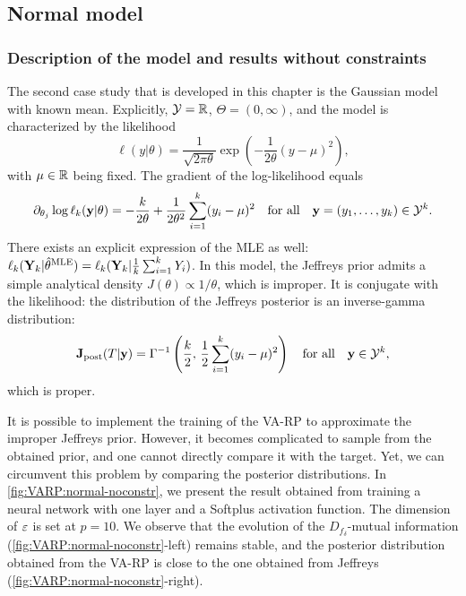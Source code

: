 \subsection{Normal model}


\subsubsection{Description of the model and results without constraints}

The second case study that is developed in this chapter is the Gaussian model with known mean. Explicitly, $\mathcal{Y}=\mathbb{R}$, $\Theta=(0,\infty)$, and the model is characterized by the likelihood 
\begin{equation}
    \ell(y|\theta) = \frac{1}{\sqrt{2\pi\theta}}\exp\left(-\frac{1}{2\theta}(y-\mu)^2\right),
\end{equation}
with $\mu\in\mathbb{R}$ being fixed. The gradient of the log-likelihood equals
\begin{equation}
    \partial_{\theta_j}\log\ell_k(\mathbf{y}|\theta) = -\frac{k}{2\theta}+\frac{1}{2\theta^2}\sum_{i=1}^k(y_i-\mu)^2\quad\text{for all}\quad \mathbf{y}=(y_1,\dots,y_k)\in\mathcal{Y}^k.
\end{equation}
There exists an explicit expression of the  MLE as well: $\ell_k(\mathbf{Y}_k|\hat\theta^{\text{MLE}})= \ell_k(\mathbf{Y}_k|\frac{1}{k}\sum_{i=1}^kY_i)$. In this model, the Jeffreys prior admits a simple analytical density $J(\theta)\propto1/\theta$, which is improper. 
It is conjugate with the likelihood: the distribution of the Jeffreys posterior is an inverse-gamma distribution:
    \begin{equation}
        \mathbf{J}_{\text{post}}(T|\mathbf{y}) = \Gamma^{-1}\left(\frac{k}{2},\,\frac{1}{2}\sum_{i=1}^{k}(y_i-\mu)^2\right)    \quad\text{for all}\quad \mathbf{y}\in\mathcal{Y}^k,
    \end{equation}
which is proper.

It is possible to implement the training of the VA-RP to approximate the improper Jeffreys prior. However, it becomes complicated to sample from the obtained prior, and one cannot directly compare it with the target. 
Yet, we can circumvent this problem by comparing the posterior distributions.
In \cref{fig:VARP:normal-noconstr}, we present the result obtained from training a neural network with one layer and a Softplus activation function. The dimension of $\varepsilon$ is set at $p=10$.
We observe that the evolution of the $D_{f_\delta}$-mutual information (\cref{fig:VARP:normal-noconstr}-left) remains stable, and the posterior distribution obtained from the VA-RP is close to the one obtained from Jeffreys (\cref{fig:VARP:normal-noconstr}-right).

